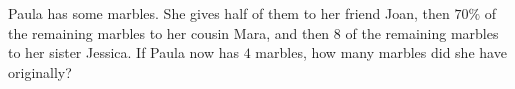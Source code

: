 Paula has some marbles. She gives half of them to her friend Joan, then $70\%$ of the remaining marbles to her cousin Mara, and then $8$ of the remaining marbles to her sister Jessica. If Paula now has $4$ marbles, how many marbles did she have originally?
